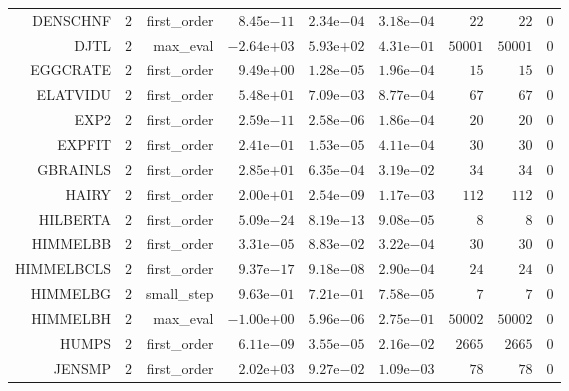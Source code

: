 \begin{longtable}{rrrrrrrrr}
DENSCHNF & \(     2\) & first\_order & \( 8.45\)e\(-11\) & \( 2.34\)e\(-04\) & \( 3.18\)e\(-04\) & \(    22\) & \(    22\) & \(     0\) \\
DJTL & \(     2\) & max\_eval & \(-2.64\)e\(+03\) & \( 5.93\)e\(+02\) & \( 4.31\)e\(-01\) & \( 50001\) & \( 50001\) & \(     0\) \\
EGGCRATE & \(     2\) & first\_order & \( 9.49\)e\(+00\) & \( 1.28\)e\(-05\) & \( 1.96\)e\(-04\) & \(    15\) & \(    15\) & \(     0\) \\
ELATVIDU & \(     2\) & first\_order & \( 5.48\)e\(+01\) & \( 7.09\)e\(-03\) & \( 8.77\)e\(-04\) & \(    67\) & \(    67\) & \(     0\) \\
EXP2 & \(     2\) & first\_order & \( 2.59\)e\(-11\) & \( 2.58\)e\(-06\) & \( 1.86\)e\(-04\) & \(    20\) & \(    20\) & \(     0\) \\
EXPFIT & \(     2\) & first\_order & \( 2.41\)e\(-01\) & \( 1.53\)e\(-05\) & \( 4.11\)e\(-04\) & \(    30\) & \(    30\) & \(     0\) \\
GBRAINLS & \(     2\) & first\_order & \( 2.85\)e\(+01\) & \( 6.35\)e\(-04\) & \( 3.19\)e\(-02\) & \(    34\) & \(    34\) & \(     0\) \\
HAIRY & \(     2\) & first\_order & \( 2.00\)e\(+01\) & \( 2.54\)e\(-09\) & \( 1.17\)e\(-03\) & \(   112\) & \(   112\) & \(     0\) \\
HILBERTA & \(     2\) & first\_order & \( 5.09\)e\(-24\) & \( 8.19\)e\(-13\) & \( 9.08\)e\(-05\) & \(     8\) & \(     8\) & \(     0\) \\
HIMMELBB & \(     2\) & first\_order & \( 3.31\)e\(-05\) & \( 8.83\)e\(-02\) & \( 3.22\)e\(-04\) & \(    30\) & \(    30\) & \(     0\) \\
HIMMELBCLS & \(     2\) & first\_order & \( 9.37\)e\(-17\) & \( 9.18\)e\(-08\) & \( 2.90\)e\(-04\) & \(    24\) & \(    24\) & \(     0\) \\
HIMMELBG & \(     2\) & small\_step & \( 9.63\)e\(-01\) & \( 7.21\)e\(-01\) & \( 7.58\)e\(-05\) & \(     7\) & \(     7\) & \(     0\) \\
HIMMELBH & \(     2\) & max\_eval & \(-1.00\)e\(+00\) & \( 5.96\)e\(-06\) & \( 2.75\)e\(-01\) & \( 50002\) & \( 50002\) & \(     0\) \\
HUMPS & \(     2\) & first\_order & \( 6.11\)e\(-09\) & \( 3.55\)e\(-05\) & \( 2.16\)e\(-02\) & \(  2665\) & \(  2665\) & \(     0\) \\
JENSMP & \(     2\) & first\_order & \( 2.02\)e\(+03\) & \( 9.27\)e\(-02\) & \( 1.09\)e\(-03\) & \(    78\) & \(    78\) & \(     0\) \\

\end{longtable}
